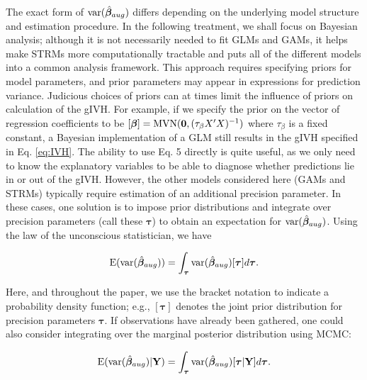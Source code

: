 \documentclass[12pt,english]{article}
\begin{document}
\begin{spacing}{1.9}
The exact form of ${\rm var}(\hat{\boldsymbol{\beta}}_{aug})$ differs depending on the underlying model structure and estimation procedure.  In the following treatment, we shall focus on Bayesian analysis; although it is not necessarily needed to fit GLMs and GAMs, it helps make STRMs more computationally tractable and puts all of the different models into a common analysis framework.  This approach requires specifying priors for model parameters, and prior parameters may appear in expressions for prediction variance.  Judicious choices of priors can at times limit the influence of priors on calculation of the gIVH.  For example, if we specify the prior on the vector of regression coefficients to be $[\boldsymbol{\beta}] = \textrm{MVN}({\bf 0},(\tau_\beta X^\prime X)^{-1})$ where $\tau_\beta$ is a fixed constant, a Bayesian implementation of a GLM still results in the gIVH specified in Eq. \ref{eq:IVH}.  The ability to use Eq. 5 directly is quite useful, as we only need to know the explanatory variables to be able to diagnose whether predictions lie in or out of the gIVH. However, the other models considered here (GAMs and STRMs) typically require estimation of an additional precision parameter.   In these cases, one solution is to impose prior distributions and integrate over precision parameters (call these $\boldsymbol{\tau}$) to obtain an expectation for ${\rm var}(\hat{\boldsymbol{\beta}}_{aug})$.  Using the law of the unconscious statistician, we have
\begin{linenomath*}
\begin{equation}
  \label{eq:E_var_Beta}
  {\rm E}({\rm var}(\hat{\boldsymbol{\beta}}_{aug}))  = \int_{\boldsymbol{\tau}} {\rm var}(\hat{\boldsymbol{\beta}}_{aug}) [\boldsymbol{\tau}] d \boldsymbol{\tau}.
\end{equation}
\end{linenomath*}
Here, and throughout the paper, we use the bracket notation to indicate a probability density function; e.g., $[\boldsymbol{\tau}] $ denotes the joint prior distribution for precision parameters $\boldsymbol{\tau}$. If observations have already been gathered, one could also consider integrating over the marginal posterior distribution using MCMC:
\begin{linenomath*}
\begin{equation}
  \label{eq:E_var_Beta_post}
  {\rm E}({\rm var}(\hat{\boldsymbol{\beta}}_{aug}) | {\bf Y})  = \int_{\boldsymbol{\tau}} {\rm var}(\hat{\boldsymbol{\beta}}_{aug}) [\boldsymbol{\tau}| {\bf Y}] d \boldsymbol{\tau}.
\end{equation}
\end{linenomath*}


\end{spacing}
\end{document}
